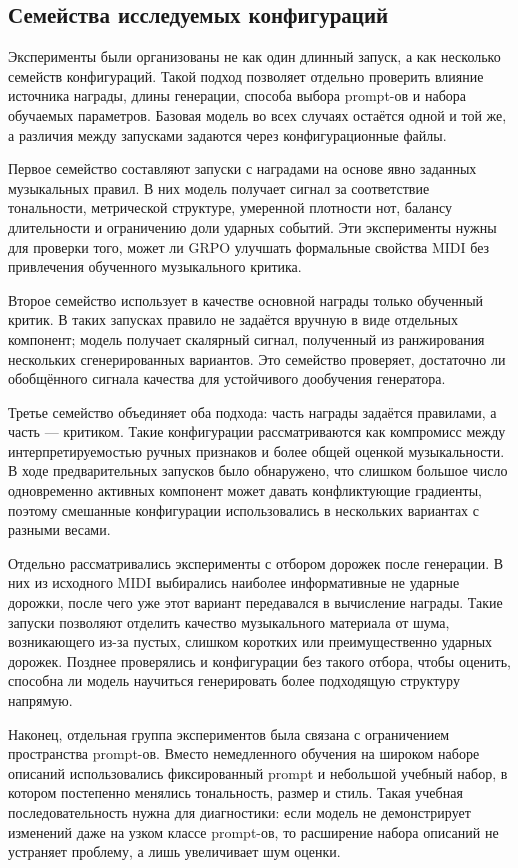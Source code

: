\documentclass[a4paper,12pt]{extarticle}
\begin{document}
\subsection{Семейства исследуемых конфигураций}

Эксперименты были организованы не как один длинный запуск, а как несколько
семейств конфигураций. Такой подход позволяет отдельно проверить влияние
источника награды, длины генерации, способа выбора prompt-ов и набора
обучаемых параметров. Базовая модель во всех случаях остаётся одной и той же,
а различия между запусками задаются через конфигурационные файлы.

Первое семейство составляют запуски с наградами на основе явно заданных
музыкальных правил. В них модель получает сигнал за соответствие тональности,
метрической структуре, умеренной плотности нот, балансу длительности и
ограничению доли ударных событий. Эти эксперименты нужны для проверки того,
может ли GRPO улучшать формальные свойства MIDI без привлечения обученного
музыкального критика.

Второе семейство использует в качестве основной награды только обученный
критик. В таких запусках правило не задаётся вручную в виде отдельных
компонент; модель получает скалярный сигнал, полученный из ранжирования
нескольких сгенерированных вариантов. Это семейство проверяет, достаточно ли
обобщённого сигнала качества для устойчивого дообучения генератора.

Третье семейство объединяет оба подхода: часть награды задаётся правилами, а
часть --- критиком. Такие конфигурации рассматриваются как компромисс между
интерпретируемостью ручных признаков и более общей оценкой музыкальности.
В ходе предварительных запусков было обнаружено, что слишком большое число
одновременно активных компонент может давать конфликтующие градиенты, поэтому
смешанные конфигурации использовались в нескольких вариантах с разными весами.

Отдельно рассматривались эксперименты с отбором дорожек после генерации.
В них из исходного MIDI выбирались наиболее информативные не ударные дорожки,
после чего уже этот вариант передавался в вычисление награды. Такие запуски
позволяют отделить качество музыкального материала от шума, возникающего из-за
пустых, слишком коротких или преимущественно ударных дорожек. Позднее
проверялись и конфигурации без такого отбора, чтобы оценить, способна ли
модель научиться генерировать более подходящую структуру напрямую.

Наконец, отдельная группа экспериментов была связана с ограничением
пространства prompt-ов. Вместо немедленного обучения на широком наборе
описаний использовались фиксированный prompt и небольшой учебный набор,
в котором постепенно менялись тональность, размер и стиль. Такая учебная
последовательность нужна для диагностики: если модель не демонстрирует
изменений даже на узком классе prompt-ов, то расширение набора описаний не
устраняет проблему, а лишь увеличивает шум оценки.
\end{document}
